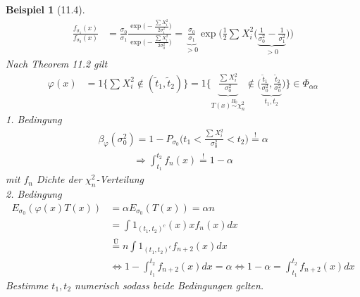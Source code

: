 \documentclass[a4paper,openany]{book}
\theoremstyle{mytheoremstyle}
\newtheorem*{bei}{Beispiel}
\theoremstyle{mytheoremstyle2}
\begin{document}
\begin{bei}[11.4]
\begin{align*}
  \frac{f _{\sigma _1}(x)}{f _{\sigma _0}(x)}
  &=\frac{\sigma _0}{\sigma _1}\frac{\exp\big(-\frac{\sum_{}^{}{X_i^2}}{2 \sigma _1^2}\big)}{\exp\big(-\frac{\sum_{}^{}{X_i^2}}{2 \sigma _0^2}\big)}=\underbrace{\frac{\sigma _0}{\sigma _1}}_{>0}\exp \bigg(\frac{1}{2}\sum_{}^{}{X_i^2}\bigg(\underbrace{\frac{1}{\sigma _0^2}-\frac{1}{\sigma _1^2}}_{>0}\bigg)\bigg)
\end{align*}
Nach Theorem 11.2 gilt 
\begin{align*}
  \varphi (x)
  &=1 \{\sum_{}^{}{X_i^2}\notin (\tilde{t}_1,\tilde{t}_2)\}
  =1 \bigg\{\underbrace{\frac{\sum_{}^{}{X_i^2}}{\sigma _0^2}}_{T(x)\overset{H_0}\sim\chi_n^2}\notin \bigg(\underbrace{\frac{\tilde{t}_1}{\sigma _0^2},\frac{\tilde{t}_2}{\sigma _0^2}}_{t_1,t_2}\bigg)\bigg\}\in \Phi _{\alpha \alpha }
\end{align*}
1. Bedingung
\begin{align*}
  \beta _{\varphi }(\sigma _0^2)=1-P _{\sigma _0}\bigg(t_1<\frac{\sum_{}^{}{X_i^2}}{\sigma _0^2}<t_2\bigg)\overset{!}=\alpha 
\end{align*}
\begin{align*}
  \Rightarrow \int_{t_1}^{t_2}{f_n(x)}\overset{!}=1-\alpha  
\end{align*}
mit $f_n$ Dichte der $\chi_n^2$-Verteilung \\
2. Bedingung 
\begin{align*}
 E _{\sigma_0 }(\varphi (x)T(x))
 &=\alpha E _{\sigma _0}(T(x))=\alpha n  \\
 &=\int{1 _{(t_1,t_2)^c}(x)xf_n(x)dx} \\
 &\overset{\text{Ü}}=n \int{1 _{(t_1,t_2)^c}f _{n+2}(x)dx}\\
 &\Leftrightarrow 1-\int_{t_1}^{t_2}{f _{n+2}(x)dx}=\alpha \Leftrightarrow 1-\alpha =\int_{t_1}^{t_2}{f _{n+2}(x)dx}
\end{align*}
Bestimme $t_1,t_2$ numerisch sodass beide Bedingungen gelten.
\end{bei}
\end{document}
